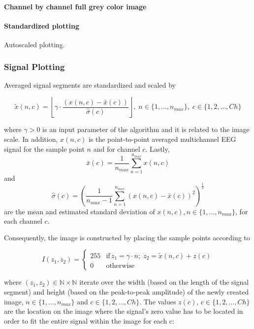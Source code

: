 \paragraph{Channel by channel full grey color image}



\paragraph{Standardized plotting}

Autoscaled plotting.


\subsubsection{Signal Plotting} \label{Plot}

Averaged signal segments are standardized and scaled by 

\begin{equation}
\tilde{x}(n,c) = \left \lfloor{ \gamma \cdot \frac{( x(n,c) - \bar{x}(c)  )}{ \hat{\sigma}(c) } }\right \rfloor, \; n \in \{ 1, \dots, n_{max}\},\; c \in \{1,2,\dots,Ch\}
\label{eq:standarizedaverages}
\end{equation}

\noindent where $\gamma > 0$ is an input parameter of the algorithm and  it is related to the image scale. In addition, $ x(n,c) $ is the point-to-point averaged multichannel EEG signal for the sample point $n$ and for channel $c$. Lastly, $$\bar{x}(c) =\frac{1}{n_{max}}\sum_{n=1}^{n_{max}}x(n,c)$$ and $$ \hat{\sigma}(c) = (\frac{1}{n_{max}-1}\sum_{n=1}^{n_{max}}(x(n,c)-\bar{x}(c))^2 )^{\frac{1}{2}}$$ are the mean and estimated standard deviation of $x(n,c), n \in \{1,\dots,n_{max}\} $, for each channel $c$.

Consequently, the image is constructed by placing the sample points according to

\begin{equation}
I(z_1,z_2) = \left\{ \begin{array}{rl}
255 & \text{if} \,  z_1 = \gamma \cdot n; \; z_2 = \tilde{x}(n,c) + z(c) \\
0   & \mbox{otherwise}
\end{array}\right.
\label{eq:images}
\end{equation}

\noindent where $ (z_1,z_2) \in \mathbb{N} \times \mathbb{N}$ iterate over the width (based on the length of the signal segment) and height (based on the peak-to-peak amplitude) of the newly created image,  $n \in \{1, \dots, n_{max}\}$ and $c \in \{1,2,\dots,Ch\}$.  The values $z(c)$, $c \in \{1,2,\dots,Ch\}$ are the location on the image where the signal's zero value has to be located in order to fit the entire signal within the image for each c:

